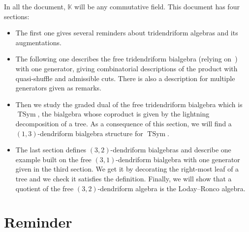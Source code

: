 \documentclass[pdftex]{sigma}
\numberwithin{equation}{section}
\theoremstyle{definition}
\theoremstyle{plain}
\newcommand{\K}{\mathbb{K}}
\DeclareMathOperator{\TSym}{TSym}
\begin{document}
In all the document, $\K$ will be any commutative field. This document has four sections:
\begin{itemize}\itemsep=0pt
	\item The first one gives several reminders about tridendriform algebras and its augmentations.
	\item The following one describes the free tridendriform bialgebra (relying on~\cite{Trial}) with one generator, giving combinatorial descriptions of the product with quasi-shuffle and admissible cuts. There is also a description for multiple generators given as remarks.
	\item Then we study the graded dual of the free tridendriform bialgebra which is $\TSym$, the bialgebra whose coproduct is given by the lightning decomposition of a tree. As a consequence of this section, we will find a $(1,3)$-dendriform bialgebra structure for $\TSym$.
	\item The last section defines $(3,2)$-dendriform bialgebras and describe one example built on the free $(3,1)$-dendriform bialgebra with one generator given in the third section. We get it by decorating the right-most leaf of a tree and we check it satisfies the definition. Finally, we will show that a quotient of the free $(3,2)$-dendriform algebra is the Loday--Ronco algebra.
\end{itemize}

\section{Reminder}
\end{document}
